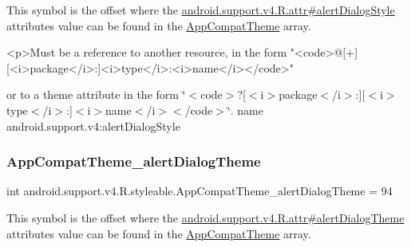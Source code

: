 This symbol is the offset where the \hyperlink{classandroid_1_1support_1_1v4_1_1R_1_1attr_aa29cc93214bbf145ac5599924699a1dc}{android.\+support.\+v4.\+R.\+attr\#alert\+Dialog\+Style} attribute\textquotesingle{}s value can be found in the \hyperlink{classandroid_1_1support_1_1v4_1_1R_1_1styleable_ac07ebbe62ed977f6dcaadc6397840ace}{App\+Compat\+Theme} array.

\begin{DoxyVerb}      <p>Must be a reference to another resource, in the form "<code>@[+][<i>package</i>:]<i>type</i>:<i>name</i></code>"
\end{DoxyVerb}
 or to a theme attribute in the form \char`\"{}$<$code$>$?\mbox{[}$<$i$>$package$<$/i$>$\+:\mbox{]}\mbox{[}$<$i$>$type$<$/i$>$\+:\mbox{]}$<$i$>$name$<$/i$>$$<$/code$>$\char`\"{}.  name android.\+support.\+v4\+:alert\+Dialog\+Style \mbox{\label{classandroid_1_1support_1_1v4_1_1R_1_1styleable_acb7db297ea9150b5e0877e2de9f24603}} 
\subsubsection{\texorpdfstring{App\+Compat\+Theme\+\_\+alert\+Dialog\+Theme}{AppCompatTheme\_alertDialogTheme}}
{\footnotesize\ttfamily int android.\+support.\+v4.\+R.\+styleable.\+App\+Compat\+Theme\+\_\+alert\+Dialog\+Theme = 94\hspace{0.3cm}{\ttfamily [static]}}

This symbol is the offset where the \hyperlink{classandroid_1_1support_1_1v4_1_1R_1_1attr_a3e3e081108a98146034d802e2e42bb9b}{android.\+support.\+v4.\+R.\+attr\#alert\+Dialog\+Theme} attribute\textquotesingle{}s value can be found in the \hyperlink{classandroid_1_1support_1_1v4_1_1R_1_1styleable_ac07ebbe62ed977f6dcaadc6397840ace}{App\+Compat\+Theme} array.

